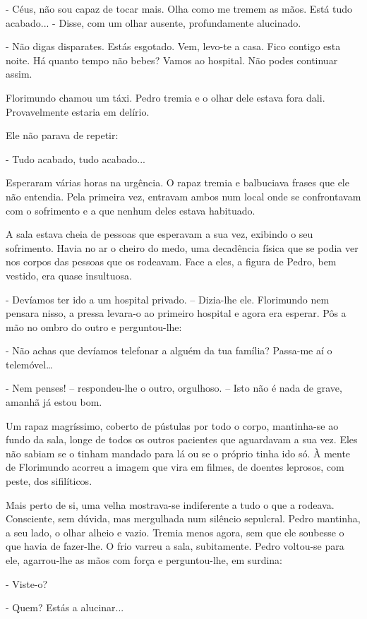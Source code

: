 - Céus, não sou capaz de tocar mais. Olha como me tremem as mãos. Está
tudo acabado... - Disse, com um olhar ausente, profundamente alucinado.

- Não digas disparates. Estás esgotado. Vem, levo-te a casa. Fico
contigo esta noite. Há quanto tempo não bebes? Vamos ao hospital. Não
podes continuar assim.

Florimundo chamou um táxi. Pedro tremia e o olhar dele estava fora dali.
Provavelmente estaria em delírio.

Ele não parava de repetir:

- Tudo acabado, tudo acabado...

Esperaram várias horas na urgência. O rapaz tremia e balbuciava frases
que ele não entendia. Pela primeira vez, entravam ambos num local onde
se confrontavam com o sofrimento e a que nenhum deles estava habituado.

A sala estava cheia de pessoas que esperavam a sua vez, exibindo o seu
sofrimento. Havia no ar o cheiro do medo, uma decadência física que se
podia ver nos corpos das pessoas que os rodeavam. Face a eles, a figura
de Pedro, bem vestido, era quase insultuosa.

- Devíamos ter ido a um hospital privado. -- Dizia-lhe ele. Florimundo
nem pensara nisso, a pressa levara-o ao primeiro hospital e agora era
esperar. Pôs a mão no ombro do outro e perguntou-lhe:

- Não achas que devíamos telefonar a alguém da tua família? Passa-me aí
o telemóvel\ldots{}

- Nem penses! -- respondeu-lhe o outro, orgulhoso. -- Isto não é nada de
grave, amanhã já estou bom.

Um rapaz magríssimo, coberto de pústulas por todo o corpo, mantinha-se
ao fundo da sala, longe de todos os outros pacientes que aguardavam a
sua vez. Eles não sabiam se o tinham mandado para lá ou se o próprio
tinha ido só. À mente de Florimundo acorreu a imagem que vira em filmes,
de doentes leprosos, com peste, dos sifilíticos.

Mais perto de si, uma velha mostrava-se indiferente a tudo o que a
rodeava. Consciente, sem dúvida, mas mergulhada num silêncio sepulcral.
Pedro mantinha, a seu lado, o olhar alheio e vazio. Tremia menos agora,
sem que ele soubesse o que havia de fazer-lhe. O frio varreu a sala,
subitamente. Pedro voltou-se para ele, agarrou-lhe as mãos com força e
perguntou-lhe, em surdina:

- Viste-o?

- Quem? Estás a alucinar...

